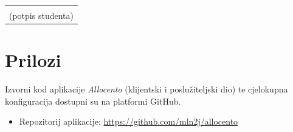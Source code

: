 \documentclass[a4paper,12pt,oneside]{article}
\begin{document}
	\hfill \begin{tabular}{c} \makebox[5cm]{\hrulefill} \\ (potpis studenta) \end{tabular}
	
	\newpage
	\section*{Prilozi}
	
	Izvorni kod aplikacije \textit{Allocento} (klijentski i poslužiteljski dio) te cjelokupna konfiguracija dostupni su na platformi GitHub.
	\begin{itemize}
		\item Repozitorij aplikacije: \url{https://github.com/mln2j/allocento}
	\end{itemize}
	
	
\end{document}
